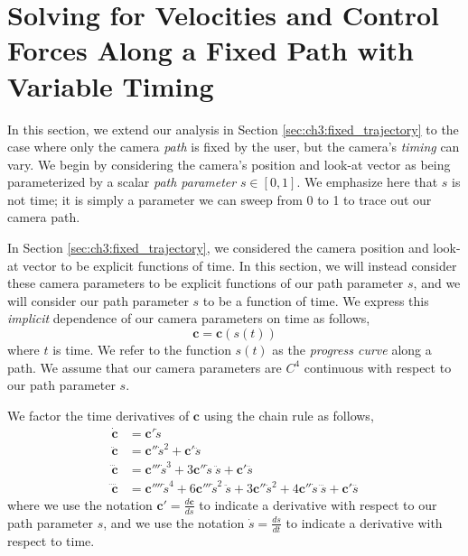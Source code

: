 \section{Solving for Velocities and Control Forces Along a Fixed Path with Variable Timing}
\label{sec:ch3:fixed_path}

In this section, we extend our analysis in Section \ref{sec:ch3:fixed_trajectory} to the case where only the camera \emph{path} is fixed by the user, but the camera's \emph{timing} can vary.
We begin by considering the camera's position and look-at vector as being parameterized by a scalar \emph{path parameter} $s \in [0,1]$.
We emphasize here that $s$ is not time; it is simply a parameter we can sweep from 0 to 1 to trace out our camera path.

In Section \ref{sec:ch3:fixed_trajectory}, we considered the camera position and look-at vector to be explicit functions of time.
In this section, we will instead consider these camera parameters to be explicit functions of our path parameter $s$, and we will consider our path parameter $s$ to be a function of time.
We express this \emph{implicit} dependence of our camera parameters on time as follows,
%
\begin{equation}
\mathbf{c} = \mathbf{c}(s(t))
\end{equation}
%
where $t$ is time.
We refer to the function $s(t)$ as the \emph{progress curve} along a path.
We assume that our camera parameters are $C^4$ continuous with respect to our path parameter $s$.

We factor the time derivatives of $\mathbf{c}$ using the chain rule as follows,
%
%
%
\begin{equation}
\begin{aligned}
\dot{\mathbf{c}}    & = \mathbf{c}' \dot{s} \\
\ddot{\mathbf{c}}   & = \mathbf{c}''   \dot{s}^2 +   \mathbf{c}'   \ddot{s} \\
\dddot{\mathbf{c}}  & = \mathbf{c}'''  \dot{s}^3 + 3 \mathbf{c}''  \dot{s}   ~\ddot{s} +   \mathbf{c}'  \dddot{s} \\
\ddddot{\mathbf{c}} & = \mathbf{c}'''' \dot{s}^4 + 6 \mathbf{c}''' \dot{s}^2 ~\ddot{s} + 3 \mathbf{c}'' \ddot{s}^2 + 4 \mathbf{c}'' \dot{s}~\dddot{s} + \mathbf{c}' \ddddot{s}
\end{aligned}
\label{eqn:ch3:cdotn}
\end{equation}
%
where we use the notation $\mathbf{c}' = \frac{d \mathbf{c}}{d s}$ to indicate a derivative with respect to our path parameter $s$, and we use the notation $\dot{s} = \frac{d s}{d t}$ to indicate a derivative with respect to time.

